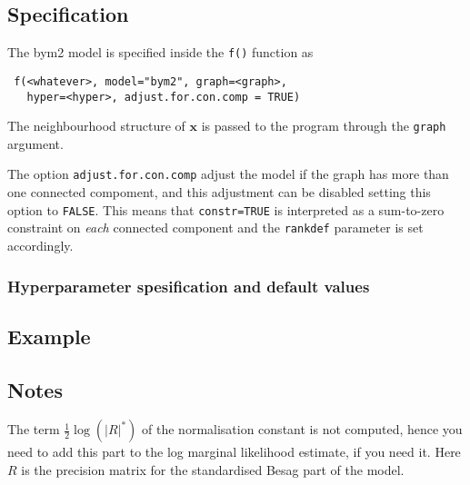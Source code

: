 \documentclass[a4paper,11pt]{article}
\begin{document}
\subsection*{Specification}

The bym2 model is specified inside the {\tt f()} function as
\begin{verbatim}
 f(<whatever>, model="bym2", graph=<graph>,
   hyper=<hyper>, adjust.for.con.comp = TRUE)
\end{verbatim}
The neighbourhood structure of $\mathbf{x}$ is passed to the program
through the {\tt graph} argument.

The option \verb|adjust.for.con.comp| adjust the model if the graph
has more than one connected compoment, and this adjustment can be
disabled setting this option to \texttt{FALSE}. This means that
\texttt{constr=TRUE} is interpreted as a sum-to-zero constraint on
\emph{each} connected component and the \texttt{rankdef} parameter is
set accordingly. 

\subsubsection*{Hyperparameter spesification and default values}



\subsection*{Example}


\subsection*{Notes}

The term $\frac{1}{2}\log(|R|^{*})$ of the normalisation constant is
not computed, hence you need to add this part to the log marginal
likelihood estimate, if you need it. Here $R$ is the precision matrix
for the standardised Besag part of the model.
\end{document}
